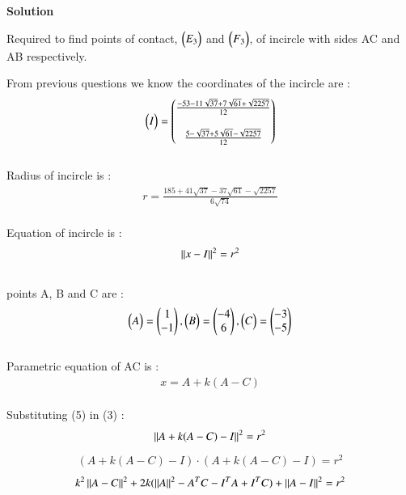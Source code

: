 \documentclass[journal,12pt,twocolumn]{IEEEtran}
\theoremstyle{remark}
\begin{document}
\begin{flushleft}
	\textbf{Solution}\\
	\bigskip

	Required to find points of contact, $\begin{pmatrix}E_{3}\end{pmatrix}$ and $\begin{pmatrix}F_{3}\end{pmatrix}$, of incircle with sides AC and AB respectively.\\

	\bigskip

	From previous questions we know the coordinates of the incircle are : 
	\begin{align}
		\begin{pmatrix}I\end{pmatrix} = 
		\begin{pmatrix}
			\frac{-53-11\sqrt{37}+7\sqrt{61}+\sqrt{2257}}{12} \\ \\
			\frac{5-\sqrt{37}+5\sqrt{61}-\sqrt{2257}}{12}
		\end{pmatrix}
	\end{align}\\

	Radius of incircle is :
    \begin{align}
		r = \frac{185+41\sqrt{37}-37\sqrt{61}-\sqrt{2257}}{6\sqrt{74}}
    \end{align}\\

	Equation of incircle is : 
	\begin{align}
		{\left\lVert x-I \right\rVert}^2 = {r}^2 
	\end{align}\\

	points A, B and C are : 
	\begin{align}
		\begin{pmatrix}A\end{pmatrix} = \begin{pmatrix}
			1\\
			-1
		\end{pmatrix}, 
		\begin{pmatrix}B\end{pmatrix} = \begin{pmatrix}
			-4\\
			6
		\end{pmatrix}, 
		\begin{pmatrix}C\end{pmatrix} = \begin{pmatrix}
			-3\\
			-5
		\end{pmatrix}
	\end{align}\\

	Parametric equation of AC is :
	\begin{align}
		x = A + k(A-C)
	\end{align}\\
	
	Substituting (5) in (3) : 
	\begin{align}
		{\left\lVert A+k(A-C)-I \right\rVert}^2 = {r}^2 
	\end{align}
	\begin{align}
		(A+k(A-C)-I)\cdot(A+k(A-C)-I) = {r}^2
	\end{align}
	\begin{align}
		k^2 \left\lVert A-C\right\rVert^2 + 2k(\left\lVert A\right\rVert^2 - {A}^T C - {I}^T A + {I}^T C) + \left\lVert A-I\right\rVert^2 = {r}^2
	\end{align}


\end{flushleft}
\end{document}
